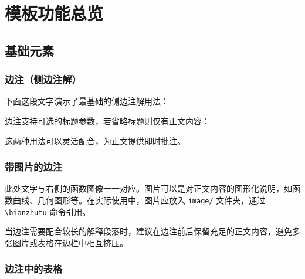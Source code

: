 \documentclass{harryopo-mathnotes}
\begin{document}
{\Large
  \tableofcontents
}
\thispagestyle{empty}
\cleardoublepage

\strictpagecheck
\setcounter{page}{1}
\restoregeometry
\onehalfspacing

\section{模板功能总览}

\subsection{基础元素}

\subsubsection{边注（侧边注解）}

下面这段文字演示了最基础的侧边注解用法：

边注支持可选的标题参数，若省略标题则仅有正文内容：


这两种用法可以灵活配合，为正文提供即时批注。

\subsubsection{带图片的边注}


此处文字与右侧的函数图像一一对应。图片可以是对正文内容的图形化说明，如函数曲线、几何图形等。在实际使用中，图片应放入 \texttt{image/} 文件夹，通过 \texttt{\textbackslash bianzhutu} 命令引用。

当边注需要配合较长的解释段落时，建议在边注前后保留充足的正文内容，避免多张图片或表格在边栏中相互挤压。

\subsubsection{边注中的表格}

\end{document}
